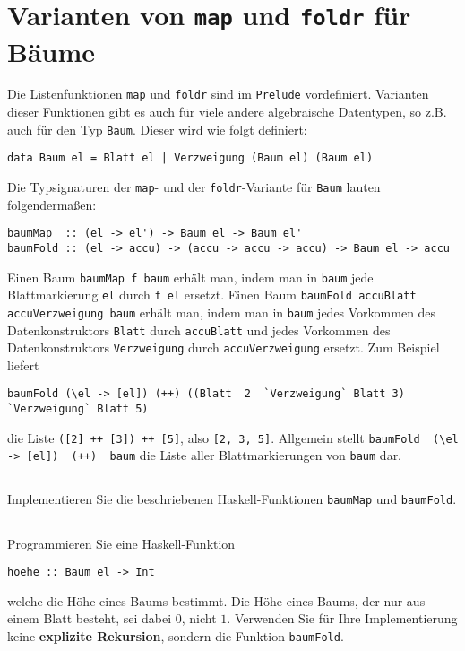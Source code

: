 \documentclass[
  10pt,                   %
  DIV12,
  german,                 %
  oneside,                %
  parskip=half,           %
  headings=normal,        %
  captions=tableheading,  %
]{scrartcl}
\begin{document}
\section{Varianten von \lstinline|map| und \lstinline|foldr| für Bäume}
Die Listenfunktionen \lstinline|map| und \lstinline|foldr| sind im \lstinline|Prelude| vordefiniert. Varianten dieser
Funktionen gibt es auch für viele andere algebraische Datentypen, so z.B. auch für den
Typ \lstinline|Baum|. Dieser wird wie folgt definiert:
\begin{lstlisting}
data Baum el = Blatt el | Verzweigung (Baum el) (Baum el)
\end{lstlisting}
Die Typsignaturen der \lstinline|map|- und der \lstinline|foldr|-Variante für \lstinline|Baum| lauten folgendermaßen:
\begin{lstlisting}
baumMap  :: (el -> el') -> Baum el -> Baum el'
baumFold :: (el -> accu) -> (accu -> accu -> accu) -> Baum el -> accu
\end{lstlisting}
Einen Baum \lstinline|baumMap f baum| erhält man, indem man in \lstinline|baum| jede Blattmarkierung \lstinline|el|
durch \lstinline|f el| ersetzt. Einen Baum \lstinline|baumFold accuBlatt accuVerzweigung baum| erhält man,
indem man in \lstinline|baum| jedes Vorkommen des Datenkonstruktors \lstinline|Blatt| durch \lstinline|accuBlatt| und
jedes Vorkommen des Datenkonstruktors \lstinline|Verzweigung| durch \lstinline|accuVerzweigung| ersetzt.
Zum Beispiel liefert
\begin{center}
\lstinline|baumFold (\el -> [el]) (++) ((Blatt  2  `Verzweigung` Blatt 3) `Verzweigung` Blatt 5)|
\end{center}
die Liste \lstinline|([2] ++ [3]) ++ [5]|, also \lstinline|[2, 3, 5]|. Allgemein stellt \lstinline|baumFold  (\el -> [el])  (++)  baum|
die Liste aller Blattmarkierungen von \lstinline|baum| dar.
\subsection{}
Implementieren Sie die beschriebenen Haskell-Funktionen \lstinline|baumMap| und \lstinline|baumFold|.
\subsection{}
Programmieren Sie eine Haskell-Funktion 
\begin{lstlisting}
hoehe :: Baum el -> Int
\end{lstlisting}
welche die Höhe
eines Baums bestimmt. Die Höhe eines Baums, der nur aus einem Blatt besteht, sei
dabei $0$, nicht $1$. Verwenden Sie für Ihre Implementierung keine \textbf{explizite Rekursion},
sondern die Funktion \lstinline|baumFold|.
\end{document}
